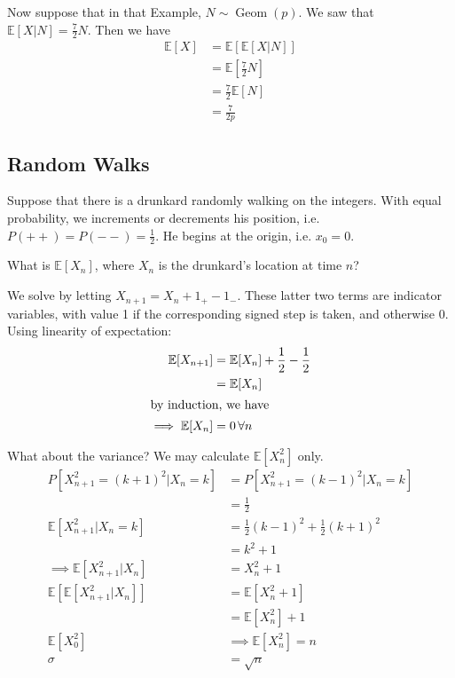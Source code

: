 \documentclass{article}
\newcommand{\E}{\mathbb E}
\DeclareMathOperator{\Geom}{Geom}
\theoremstyle{remark}
\theoremstyle{definition}
\begin{document}
Now suppose that in that Example, $N \sim \Geom(p)$.
We saw that $\E[X|N] = \frac72N$.
Then we have
\begin{align*}
    \E[X] & = \E[\E[X|N]]   \\
          & = \E[\frac72 N] \\
          & = \frac72 \E[N] \\
          & = \frac{7}{2p}
\end{align*}

\subsection*{Random Walks}
Suppose that there is a drunkard randomly walking on the integers.
With equal probability, we increments or decrements his position, i.e. $P(++) = P(--) = \frac12$.
He begins at the origin, i.e. $x_0 = 0$.

What is $\E[X_n]$, where $X_n$ is the drunkard's location at time $n$?

We solve by letting $X_{n+1} = X_n + 1_+ - 1_-$.
These latter two terms are indicator variables, with value 1 if the corresponding signed step is taken, and otherwise 0.
Using linearity of expectation:
\begin{align*}
    \E[X_{n+1}]      & = \E[X_n] + \frac12 - \frac12 \\
                     & = \E[X_n]                     \\
    \intertext{by induction, we have}
    \implies \E[X_n] & = 0 \, \forall n
\end{align*}

What about the variance?
We may calculate $\E[X_n^2]$ only.
\begin{align*}
    P[X_{n+1}^2 = (k+1)^2 | X_n = k] & = P[X_{n+1}^2 = (k-1)^2 | X_n = k] \\ %
                                     & = \frac12                          \\
    \E[X_{n+1}^2 | X_n = k]          & = \frac12(k-1)^2 + \frac12(k+1)^2  \\
                                     & = k^2 + 1                          \\
    \implies \E[X_{n+1}^2 | X_n]     & = X_n^2 + 1                        \\
    \E[\E[X_{n+1}^2 | X_n]]          & = \E[X_n^2 + 1]                    \\
                                     & = \E[X_n^2] + 1                    \\
    \E[X_0^2]                        & \implies \E[X_n^2] = n             \\
    \sigma                           & = \sqrt{n}
\end{align*}
\end{document}
